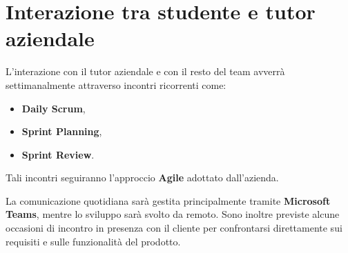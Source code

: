 \section*{Interazione tra studente e tutor aziendale}

L’interazione con il tutor aziendale e con il resto del team avverrà settimanalmente attraverso incontri ricorrenti come:

\begin{itemize}
    \item \textbf{Daily Scrum},
    \item \textbf{Sprint Planning},
    \item \textbf{Sprint Review}.
\end{itemize}

Tali incontri seguiranno l’approccio \textbf{Agile} adottato dall’azienda.

La comunicazione quotidiana sarà gestita principalmente tramite \textbf{Microsoft Teams}, mentre lo sviluppo sarà svolto da remoto. Sono inoltre previste alcune occasioni di incontro in presenza con il cliente per confrontarsi direttamente sui requisiti e sulle funzionalità del prodotto.
